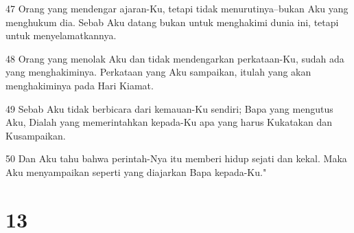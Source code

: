\par 47 Orang yang mendengar ajaran-Ku, tetapi tidak menurutinya--bukan Aku yang menghukum dia. Sebab Aku datang bukan untuk menghakimi dunia ini, tetapi untuk menyelamatkannya.
\par 48 Orang yang menolak Aku dan tidak mendengarkan perkataan-Ku, sudah ada yang menghakiminya. Perkataan yang Aku sampaikan, itulah yang akan menghakiminya pada Hari Kiamat.
\par 49 Sebab Aku tidak berbicara dari kemauan-Ku sendiri; Bapa yang mengutus Aku, Dialah yang memerintahkan kepada-Ku apa yang harus Kukatakan dan Kusampaikan.
\par 50 Dan Aku tahu bahwa perintah-Nya itu memberi hidup sejati dan kekal. Maka Aku menyampaikan seperti yang diajarkan Bapa kepada-Ku."

\chapter{13}

